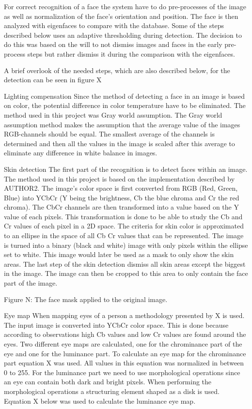 For correct recognition of a face the system have to do pre-processes of the image as well as normalization of the face’s orientation and position. The face is then analyzed with eigenfaces to compare with the database. Some of the steps described below uses an adaptive thresholding during detection. The decision to do this was based on the will to not dismiss images and faces in the early pre-process steps but rather dismiss it during the comparison with the eigenfaces.

A brief overlook of the needed steps, which are also described below, for the detection can be seen in figure X


Lighting compensation
Since the method of detecting a face in an image is based on color, the potential difference in color temperature have to be eliminated. The method used in this project was Gray world assumption. The Gray world assumption method makes the assumption that the average value of the images RGB-channels should be equal. The smallest average of the channels is determined and then all the values in the image is scaled after this average to eliminate any difference in white balance in images.

Skin detection
The first part of the recognition is to detect faces within an image. The method used in this project is based on the implementation described by AUTHOR2. The image’s color space is first converted from RGB (Red, Green, Blue) into YCbCr (Y being the brightness, Cb the blue chroma and Cr the red chroma). The CbCr channels are then transformed into a value based on the Y value of each pixels. This transformation is done to be able to study the Cb and Cr values of each pixel in a 2D space. The criteria for skin color is approximated to an ellipse in the space of all Cb Cr values that can be represented. The image is turned into a binary (black and white) image with only pixels within the ellipse set to white. This image would later be used as a mask to only show the skin areas. The last step of the skin detection dismiss all skin areas except the biggest in the image. The image can then be cropped to this area to only contain the face part of the image.


Figure N: The face mask applied to the original image.

Eye map
When mapping eyes of a person a methodology presented by X is used. The input image is converted into YCbCr color space. This is done because according to observations high Cb values and low Cr values are found around the eyes. Two different eye maps are calculated, one for the chrominance part of the eye and one for the luminance part. To calculate an eye map for the chrominance part equation X was used. All values in this equation was normalized in between 0 to 255. For the luminance part we need to use morphological operations since an eye can contain both dark and bright pixels. When performing the morphological operations a structuring element shaped as a disk is used. Equation X below was used to calculate the luminance eye map.

